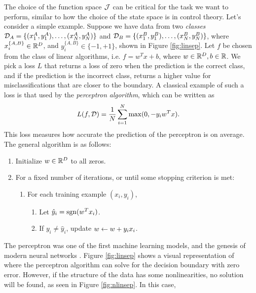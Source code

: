 The choice of the function space $\mathcal{J}$ can be critical for the task we want to perform,
similar to how the choice of the state space is in control theory. Let's consider a simple
example. Suppose we have data from two \emph{classes} $\mathcal{D}_A = \{(x_1^A, y_1^A), \dots, (x_N^A, y_N^A)\}$ and 
$\mathcal{D}_B = \{(x_1^B, y_1^B), \dots, (x_N^B, y_N^B)\}$, where $x_i^{\{A,B\}}\in\mathbb{R}^D$, and $y_i^{\{A,B\}}\in\{-1,+1\}$, shown
in Figure \ref{fig:linsep}. Let $f$ be chosen from the class of linear algorithms, i.e. $f = w^Tx + b$, where $w\in\mathbb{R}^D, b\in\mathbb{R}$. 
We pick a loss $L$ that returns a loss of zero when the prediction is the correct class, and if the prediction is the incorrect class,
returns a higher value for misclassifications that are closer to the boundary. A classical example of such a loss is that used by
the \emph{perceptron algorithm}, which can be written as 
\begin{align}\eqlabel{perc_loss}
 L(f, \sampSetClass) = \frac{1}{\nsamp}\sum_{i=1}^N\max(0, -y_iw^Tx). 
\end{align}
This loss measures how accurate the prediction of the perceptron is on average. The general algorithm is as follows:
\begin{enumerate}
 \item Initialize $w\in\mathbb{R}^D$ to all zeros. 
 \item For a fixed number of iterations, or until some stopping criterion is met:
       \begin{enumerate}
        \item For each training example $(x_i, y_i)$,
              \begin{enumerate}
               \item Let $\hat{y}_i=\mathrm{sgn}(w^Tx_i)$.
               \item If $y_i\neq\hat{y}_i$, update $w \leftarrow w + y_ix_i$.
              \end{enumerate}
       \end{enumerate}
\end{enumerate}
The perceptron was one of the first machine learning models, and the genesis of modern neural networks \cite{rosenblatt1958perceptron}. 
Figure \ref{fig:linsep} shows a visual representation of where the perceptron algorithm can solve for the decision boundary with zero error. 
However, if the structure of the data has some nonlinearities, no solution will be found, as seen in Figure \ref{fig:nlinsep}. In this case,
